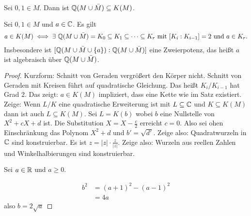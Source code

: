 \begin{Bem}
    Sei \(0,1\in M\). Dann ist \(\mathbb{Q}(M\cup\bar M)\subseteq K(M)\).
\end{Bem}
\begin{Satz}
    Sei \(0,1\in M\) und \(a\in \mathbb{C}\). Es gilt
    \begin{align*} a\in K(M)\iff\exists\ \mathbb{Q}(M\cup\bar M)=K_0\subseteq K_1\subseteq\dots\subseteq K_r \text{ mit }[K_i:K_{i-1}]=2 \text{ und }a\in K_r.
    \end{align*}
    Insbesondere ist \([\mathbb{Q}(M\cup\bar M\cup\{a\}):\mathbb{Q}(M\cup\bar M)]\) eine Zweierpotenz, das heißt \(a\) ist algebraisch über \(\mathbb{Q}(M\cup\bar M)\).
\end{Satz}
\begin{proof}
    Kurzform: Schnitt von Geraden vergrößert den Körper nicht. Schnitt von Geraden mit Kreisen führt auf quadratische Gleichung. Das heißt \(K_i/K_{i-1}\) hat Grad 2. Das zeigt: \(a\in K(M)\) impliziert, dass eine Kette wie im Satz existiert.
    Zeige: Wenn \(L/K\) eine quadratische Erweiterung ist mit \(L\subseteq \mathbb{C}\) und \(K\subseteq K(M)\) dann ist auch \(L\subseteq K(M)\).
    Sei \(L=K(b)\) wobei \(b\) eine Nullstelle von \(X^2+cX+d\) ist. Die Substitution \(X=X-\frac{c}{2}\) erreicht \(c=0\). Also sei ohen Einschränkung das Polynom \(X^2+d\) und \(b'=\sqrt{d'}\). Zeige also: Quadratwurzeln in \(\mathbb{C}\) sind konstruierbar. Es ist \(z=|z|\cdot\frac{z}{|z|}\). Zeige also: Wurzeln aus reellen Zahlen und Winkelhalbierungen sind konstruierbar.
    \begin{center}\end{center}
    Sei \(a\in\mathbb{R}\) und \(a\geq 0\).
    \begin{center}\end{center}
    \begin{align*}
        b^2&=(a+1)^2-(a-1)^2\\
        &=4a
    \end{align*} also \(b=2\sqrt{a}\)
\end{proof}
